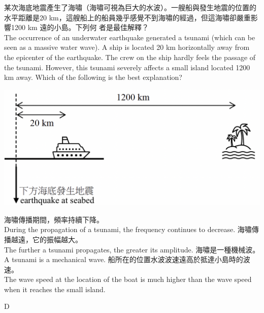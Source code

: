 {
    某次海底地震產生了海嘯（海嘯可視為巨大的水波）。一艘船與發生地震的位置的水平距離是20
    km，這艘船上的船員幾乎感覺不到海嘯的經過，但這海嘯卻嚴重影響1200 km 遠的小島。下列何
    者是最佳解釋？\\The occurrence of an underwater earthquake generated a tsunami (which can be seen as a massive water wave). A ship is located 20 km horizontally away from the epicenter of the earthquake. The crew on the ship hardly feels the passage of the tsunami. However, this tsunami severely affects a small island located 1200 km away. Which of the following is the best explanation?
    \par{\par\centering\includegraphics[width=.5\textwidth]{./img/ch2_weekend_mc_2024-05-31-18-52-07.png}\par}
    \begin{tasks}
        \task 海嘯傳播期間，頻率持續下降。\\During the propagation of a tsunami, the frequency continues to decrease.
        \task 海嘯傳播越遠，它的振幅越大。\\The further a tsunami propagates, the greater its amplitude.
        \task 海嘯是一種機械波。\\A tsunami is a mechanical wave.
        \task 船所在的位置水波波速遠高於抵達小島時的波速。\\The wave speed at the location of the boat is much higher than the wave speed when it reaches the small island.
    \end{tasks}

}{D}


